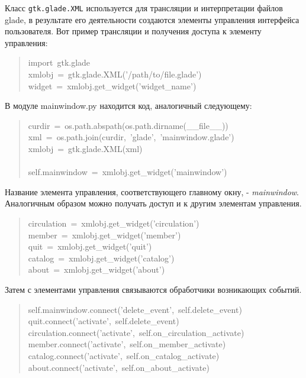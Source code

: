 \documentclass[a4paper,openany,twoside,final]{book}
\providecommand*{\DUroletitlereference}[1]{\textsl{#1}}
\begin{document}
Класс \texttt{gtk.glade.XML} используется для трансляции и интерпретации
файлов glade, в результате его деятельности создаются элементы
управления интерфейса пользователя.  Вот пример трансляции и получения
доступа к элементу управления:

\begin{quote}{\ttfamily \raggedright \noindent
import~gtk.glade\\
xmlobj~=~gtk.glade.XML('/path/to/file.glade')\\
widget~=~xmlobj.get\_widget('widget\_name')
}
\end{quote}

В модуле mainwindow.py находится код, аналогичный следующему:

\begin{quote}{\ttfamily \raggedright \noindent
curdir~=~os.path.abspath(os.path.dirname(\_\_file\_\_))\\
xml~=~os.path.join(curdir,~'glade',~'mainwindow.glade')\\
xmlobj~=~gtk.glade.XML(xml)\\
~\\
self.mainwindow~=~xmlobj.get\_widget('mainwindow')
}
\end{quote}

Название элемента управления, соответствующего главному окну, -
\DUroletitlereference{mainwindow}.  Аналогичным образом можно получать доступ и к другим
элементам управления.

\begin{quote}{\ttfamily \raggedright \noindent
circulation~=~xmlobj.get\_widget('circulation')\\
member~=~xmlobj.get\_widget('member')\\
quit~=~xmlobj.get\_widget('quit')\\
catalog~=~xmlobj.get\_widget('catalog')\\
about~=~xmlobj.get\_widget('about')
}
\end{quote}

Затем с элементами управления связываются обработчики возникающих
событий.

\begin{quote}{\ttfamily \raggedright \noindent
self.mainwindow.connect('delete\_event',~self.delete\_event)\\
quit.connect('activate',~self.delete\_event)\\
circulation.connect('activate',~self.on\_circulation\_activate)\\
member.connect('activate',~self.on\_member\_activate)\\
catalog.connect('activate',~self.on\_catalog\_activate)\\
about.connect('activate',~self.on\_about\_activate)
}
\end{quote}
\end{document}
